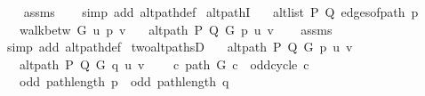 \begin{isabellebody}
\ \ %
\endisadelimproof
%
\isatagproof
{}\isamarkupfalse%
\ assms\isanewline
\ \ \isamarkupfalse%
\ {\isacharparenleft}{\kern0pt}simp\ add{\isacharcolon}{\kern0pt}\ alt{\isacharunderscore}{\kern0pt}path{\isacharunderscore}{\kern0pt}def{\isacharparenright}{\kern0pt}{\isacharplus}{\kern0pt}%
\endisatagproof
{\isafoldproof}%
%
\isadelimproof
\isanewline
%
\endisadelimproof
%
\isadeliminvisible
\isanewline
%
\endisadeliminvisible
%
\isataginvisible
{}\isamarkupfalse%
\ alt{\isacharunderscore}{\kern0pt}pathI{\isacharcolon}{\kern0pt}\isanewline
\ \ \ {\isachardoublequoteopen}alt{\isacharunderscore}{\kern0pt}list\ P\ Q\ {\isacharparenleft}{\kern0pt}edges{\isacharunderscore}{\kern0pt}of{\isacharunderscore}{\kern0pt}path\ p{\isacharparenright}{\kern0pt}{\isachardoublequoteclose}\isanewline
\ \ \ {\isachardoublequoteopen}walk{\isacharunderscore}{\kern0pt}betw\ G\ u\ p\ v{\isachardoublequoteclose}\isanewline
\ \ \ {\isachardoublequoteopen}alt{\isacharunderscore}{\kern0pt}path\ P\ Q\ G\ p\ u\ v{\isachardoublequoteclose}%
\endisataginvisible
{\isafoldinvisible}%
%
\isadeliminvisible
\isanewline
%
\endisadeliminvisible
%
\isadelimproof
\ \ %
\endisadelimproof
%
\isatagproof
{}\isamarkupfalse%
\ assms\isanewline
\ \ \isamarkupfalse%
\ {\isacharparenleft}{\kern0pt}simp\ add{\isacharcolon}{\kern0pt}\ alt{\isacharunderscore}{\kern0pt}path{\isacharunderscore}{\kern0pt}def{\isacharparenright}{\kern0pt}%
\endisatagproof
{\isafoldproof}%
%
\isadelimproof
\isanewline
%
\endisadelimproof
\isanewline
{}\isamarkupfalse%
\ two{\isacharunderscore}{\kern0pt}alt{\isacharunderscore}{\kern0pt}pathsD{\isacharcolon}{\kern0pt}\isanewline
\ \ \ {\isachardoublequoteopen}alt{\isacharunderscore}{\kern0pt}path\ P\ Q\ G\ p\ u\ v{\isachardoublequoteclose}\isanewline
\ \ \ {\isachardoublequoteopen}alt{\isacharunderscore}{\kern0pt}path\ P\ Q\ G\ q\ u\ v{\isachardoublequoteclose}\isanewline
\ \ \ {\isachardoublequoteopen}{\isasymnot}\ {\isacharparenleft}{\kern0pt}{\isasymexists}c{\isachardot}{\kern0pt}\ path\ G\ c\ {\isasymand}\ odd{\isacharunderscore}{\kern0pt}cycle\ c{\isacharparenright}{\kern0pt}{\isachardoublequoteclose}\isanewline
\ \ \ {\isachardoublequoteopen}odd\ {\isacharparenleft}{\kern0pt}path{\isacharunderscore}{\kern0pt}length\ p{\isacharparenright}{\kern0pt}\ {\isacharequal}{\kern0pt}\ odd\ {\isacharparenleft}{\kern0pt}path{\isacharunderscore}{\kern0pt}length\ q{\isacharparenright}{\kern0pt}{\isachardoublequoteclose}\isanewline

\end{isabellebody}
